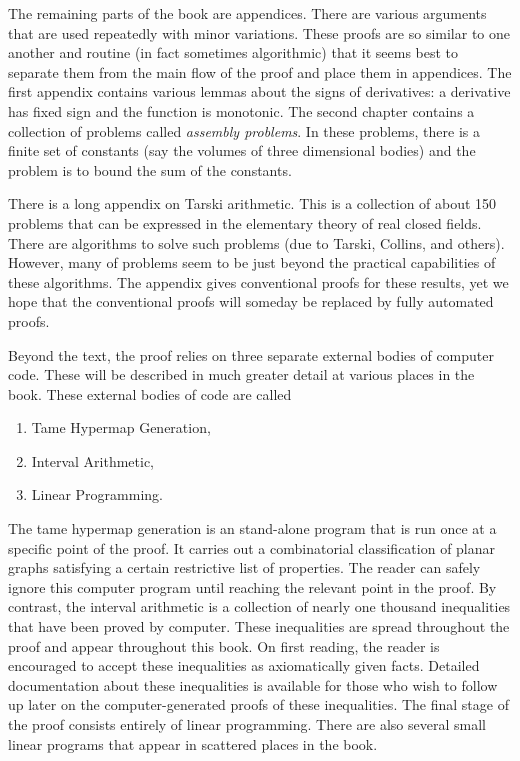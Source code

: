 The remaining parts of the book are appendices.
There are various arguments that are used repeatedly with minor variations.
These proofs are so similar to one another and routine (in fact sometimes algorithmic) that it seems
best to separate them from the main flow of the proof and place them in appendices.  The first appendix contains various lemmas about the signs of derivatives: a derivative has fixed sign and the function is monotonic.  The second chapter contains a collection of problems called {\it assembly problems}.  In these problems, there is a finite set of constants (say the volumes of three dimensional bodies) and the problem is to bound the sum of the constants.  

There is a long appendix on Tarski arithmetic.  This is a collection of about 150 problems that can be expressed in the elementary theory of real closed fields.  There are algorithms to solve such problems (due to Tarski, Collins, and others).  However, many of problems seem to be just beyond the practical capabilities of these algorithms.  The appendix gives conventional proofs for these results, yet we hope that the conventional proofs will someday be replaced by fully automated proofs.

Beyond the text,
the proof relies on three separate external bodies of computer code.  These will be described in much greater detail at various places in the book.  These external bodies of code are called
\begin{enumerate}
\item Tame Hypermap Generation,
\item Interval Arithmetic,
\item Linear Programming.
\end{enumerate}
The tame hypermap generation is an stand-alone program that is run once at a specific point of the proof.  It carries out a combinatorial classification of planar graphs satisfying a certain restrictive list of properties.  The reader can safely ignore this computer program until reaching the relevant point in the proof.   By contrast, the interval arithmetic is a collection of nearly one thousand inequalities that have been proved by computer.   These inequalities are spread throughout the proof and appear throughout this book.  On first reading, the reader is encouraged to accept these inequalities as axiomatically given facts.   Detailed documentation about these inequalities is available for those who wish to follow up later on the computer-generated proofs of these inequalities.  The final stage of the proof consists entirely of linear programming.  There are also several small linear programs that appear in scattered places in the book.



